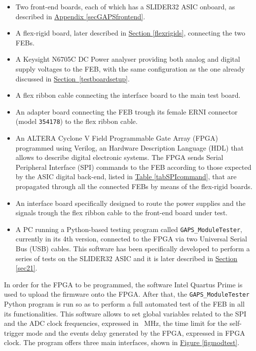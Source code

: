 \begin{itemize}
    \itemsep0em 
    \item Two front-end boards, each of which has a SLIDER32 ASIC onboard, as described in \hyperref[secGAPSfrontend]{Appendix \ref{secGAPSfrontend}}.
    \item A flex-rigid board, later described in \hyperref[flexrigids]{Section \ref{flexrigids}}, connecting the two FEBs.
    \item A Keysight N6705C DC Power analyser providing both analog and digital supply voltages to the FEB, with the same configuration as the one already discussed in \mbox{\hyperref[testboardsetup]{Section \ref{testboardsetup}}}.
    \item A flex ribbon cable connecting the interface board to the main test board.
    \item An adapter board connecting the FEB trough its female ERNI connector (model \texttt{354178}) to the flex ribbon cable.
    \item An ALTERA Cyclone V Field Programmable Gate Array (FPGA) programmed using Verilog, an Hardware Description Language (HDL) that allows to describe digital electronic systems. The FPGA sends Serial Peripheral Interface (SPI) commands to the FEB according to those expected by the ASIC digital back-end, listed in \hyperref[tabSPIcommand]{Table \ref{tabSPIcommand}}, that are propagated through all the connected FEBs by means of the flex-rigid boards.
    \item An interface board specifically designed to route the power supplies and the signals trough the flex ribbon cable to the front-end board under test.
    \item A PC running a Python-based testing program called \texttt{GAPS\_ModuleTester}, currently in its 4th version, connected to the FPGA via two Universal Serial Bus (USB) cables. This software has been specifically developed to perform a series of tests on the SLIDER32 ASIC and it is later described in \hyperref[sec21]{Section \ref{sec21}}.
\end{itemize}

\noindent
In order for the FPGA to be programmed, the software Intel Quartus Prime is used to upload the firmware onto the FPGA. After that, the \texttt{GAPS\_ModuleTester} Python program is run so as to perform a full automated test of the FEB in all its functionalities. This software allows to set global variables related to the SPI and the ADC clock frequencies, expressed in \SI{}{\mega\hertz}, the time limit for the self-trigger mode and the events delay generated by the FPGA, expressed in FPGA clock. The program offers three main interfaces, shown in \hyperref[figmodtest]{Figure \ref{figmodtest}}.

